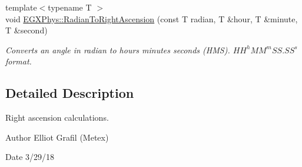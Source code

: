 \begin{DoxyCompactItemize}
{\footnotesize template$<$typename T $>$ }\\void \mbox{\hyperlink{group___e_g_x_phys-_astrophysics-_right_ascension_ga624dd87144a17d19d0100500c34da978}{E\+G\+X\+Phys\+::\+Radian\+To\+Right\+Ascension}} (const T radian, T \&hour, T \&minute, T \&second)
\begin{DoxyCompactList}\small\item\em Converts an angle in radian to hours minutes seconds (H\+MS). ${HH}^h{MM}^m{SS.SS}^s$ format. \end{DoxyCompactList}\end{DoxyCompactItemize}


\subsection{Detailed Description}
Right ascension calculations. 

\begin{DoxyAuthor}{Author}
Elliot Grafil (Metex) 
\end{DoxyAuthor}
\begin{DoxyDate}{Date}
3/29/18 
\end{DoxyDate}
